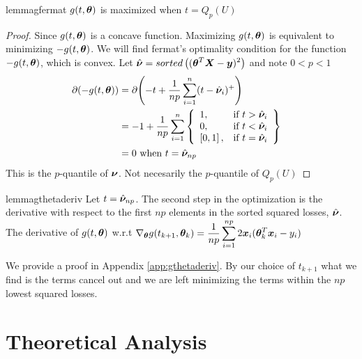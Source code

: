 \documentclass{article} %
\begin{document}
	\begin{restatable}{lemma}{gfermat}\label{lem:gfermat}
		$g(t,{\bm{\theta}})$ is maximized when $t = Q_p(U)$
	\end{restatable}
		\begin{proof}
		Since $\displaystyle g(t,{\bm{\theta}})$ is a concave function. Maximizing $g(t,{\bm{\theta}})$ is equivalent to minimizing $-g(t,{\bm{\theta}})$. We will find fermat's optimality condition for the function $\displaystyle -g(t,{\bm{\theta}})$, which is convex. 
		Let $\displaystyle \hat{{\bm{\nu}}} = sorted\left(({\bm{\theta}}^T{\bm{X}} - {\bm{y}})^2\right)$ and note $\displaystyle 0 < p < 1$
		\begin{align}
			\partial{\displaystyle (-g(t,\boldsymbol{\theta}})) &= \partial{\left(-t + \frac{1}{np}\sum_{i=1}^{n}(t-\hat{{\bm{\nu}}}_i)^+\right)} &&\\
			&= -1 + \frac{1}{np}\sum_{i=1}^{n}
			\left\{
			\begin{array}{lr}
				1, & \text{if } t > \hat{{\bm{\nu}}}_i\\
				0, & \text{if } t < \hat{{\bm{\nu}}}_i \\
				\left[0,1\right], & \text{if } t = \hat{{\bm{\nu}}}_i \\
			\end{array}
			\right\}&&\\
			&= 0 \text{ when }\displaystyle t = \hat{{\bm{\nu}}}_{np}&&
		\end{align}
		This is the $p$-quantile of $\displaystyle {\bm{\nu}}$. Not necesarily the $p$-quantile of $Q_p(U)$
	\end{proof}
	
	\begin{restatable}{lemma}{gthetaderiv}\label{lem:gthetaderiv}
		Let $t = \hat{{\bm{\nu}}}_{np}$. The second step in the optimization is the derivative with respect to the first $np$ elements in the sorted squared losses, $\hat{{\bm{\nu}}}$. The derivative of $g(t,{\bm{\theta}})$ w.r.t $\displaystyle \nabla_{{\bm{\theta}}}g(t_{k+1},{\bm{\theta}}_k) = \frac{1}{np}\sum_{i=1}^{np}2{\bm{x}}_i({\bm{\theta}}_k^T{\bm{x}}_i - y_i)$
	\end{restatable}
	We provide a proof in Appendix \ref{app:gthetaderiv}. By our choice of $t_{k+1}$ what we find is the terms cancel out and we are left minimizing the terms within the $np$ lowest squared losses.

	\section{Theoretical Analysis}
\end{document}
